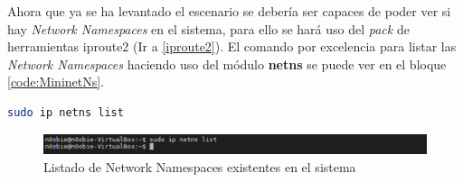 Ahora que ya se ha levantado el escenario se debería ser capaces de poder ver si hay \textit{Network Namespaces} en el sistema, para ello se hará uso del \textit{pack} de herramientas iproute2 (Ir a \ref{iproute2}). El comando por excelencia para listar las \textit{Network Namespaces} haciendo uso del módulo \textbf{netns} se puede ver en el bloque \ref{code:MininetNs}.


\begin{lstlisting}[language= bash, style=Consola, caption={Listar Network Namespaces},label=code:MininetNs]
    sudo ip netns list
\end{lstlisting}
\vspace{0.5cm}

\begin{figure}[ht]
    \centering
    \includegraphics[width=15.5cm]{archivos/img/teoria/mn_02.png}
    \caption{Listado de Network Namespaces existentes en el sistema}
    \label{fig:mininet_02}
\end{figure}

